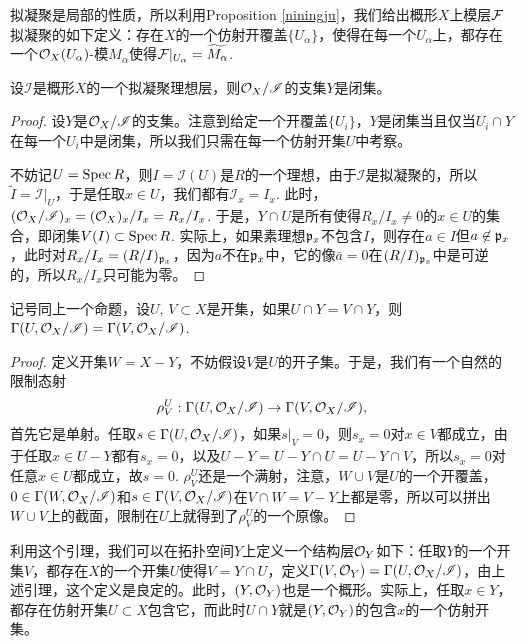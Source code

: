 拟凝聚是局部的性质，所以利用Proposition \ref{niningju}，我们给出概形$X$上模层$\mathcal{F}$拟凝聚的如下定义：存在$X$的一个仿射开覆盖$\{U_\alpha\}$，使得在每一个$U_\alpha$上，都存在一个$\mathcal{O}_X(U_\alpha)$-模$M_\alpha$使得$\mathcal{F}|_{U_\alpha}=\widetilde{M_\alpha}$.

\begin{pro}
设$\mathscr{I}$是概形$X$的一个拟凝聚理想层，则$\mathcal{O}_X/\mathscr{I}$的支集$Y$是闭集。
\end{pro}

\begin{proof}
设$Y$是$\mathcal{O}_X/\mathscr{I}$的支集。注意到给定一个开覆盖$\{U_i\}$，$Y$是闭集当且仅当$U_i\cap Y$在每一个$U_i$中是闭集，所以我们只需在每一个仿射开集$U$中考察。

不妨记$U=\operatorname{Spec} R$，则$I=\mathscr{I}(U)$是$R$的一个理想，由于$\mathscr{I}$是拟凝聚的，所以$\widetilde{I}=\mathscr{I}|_U$，于是任取$x\in U$，我们都有$\mathscr{I}_x=I_x$. 此时，$(\mathcal{O}_X/\mathscr{I})_x=(\mathcal{O}_X)_x/I_x=R_x/I_x$. 于是，$Y\cap U$是所有使得$R_x/I_x\neq 0$的$x\in U$的集合，即闭集$V(I)\subset \operatorname{Spec} R$. 实际上，如果素理想$\mathfrak{p}_x$不包含$I$，则存在$a\in I$但$a\not\in \mathfrak{p}_x$，此时对$R_x/I_x=(R/I)_{\mathfrak{p}_x}$，因为$a$不在$\mathfrak{p}_x$中，它的像$\bar{a}=0$在$(R/I)_{\mathfrak{p}_x}$中是可逆的，所以$R_x/I_x$只可能为零。
\end{proof}

\begin{lem}
记号同上一个命题，设$U$, $V\subset X$是开集，如果$U\cap Y=V\cap Y$，则$\Gamma(U,\mathcal{O}_X/\mathscr{I})=\Gamma(V,\mathcal{O}_X/\mathscr{I})$.
\end{lem}

\begin{proof}
定义开集$W=X-Y$，不妨假设$V$是$U$的开子集。于是，我们有一个自然的限制态射
\[
	\rho^U_V:\Gamma(U,\mathcal{O}_X/\mathscr{I})\to\Gamma(V,\mathcal{O}_X/\mathscr{I}),
\]
首先它是单射。任取$s\in \Gamma(U,\mathcal{O}_X/\mathscr{I})$，如果$s|_V=0$，则$s_x=0$对$x\in V$都成立，由于任取$x\in U-Y$都有$s_x=0$，以及$U-Y=U-Y\cap U=U-Y\cap V$，所以$s_x=0$对任意$x\in U$都成立，故$s=0$. $\rho^U_V$还是一个满射，注意，$W\cup V$是$U$的一个开覆盖，$0\in \Gamma(W,\mathcal{O}_X/\mathscr{I})$和$s\in \Gamma(V,\mathcal{O}_X/\mathscr{I})$在$V\cap W=V-Y$上都是零，所以可以拼出$W\cup V$上的截面，限制在$U$上就得到了$\rho^U_V$的一个原像。
\end{proof}

利用这个引理，我们可以在拓扑空间$Y$上定义一个结构层$\mathcal{O}_Y$如下：任取$Y$的一个开集$V$，都存在$X$的一个开集$U$使得$V=Y\cap U$，定义$\Gamma(V,\mathcal{O}_Y)=\Gamma(U,\mathcal{O}_X/\mathscr{I})$，由上述引理，这个定义是良定的。此时，$(Y,\mathcal{O}_Y)$也是一个概形。实际上，任取$x\in Y$，都存在仿射开集$U\subset X$包含它，而此时$U\cap Y$就是$(Y,\mathcal{O}_Y)$的包含$x$的一个仿射开集。


